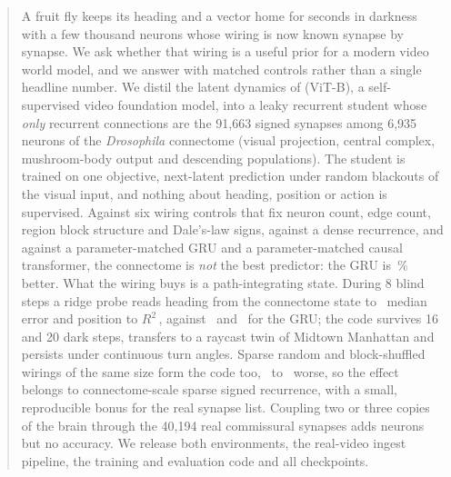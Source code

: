 \begin{abstract}
A fruit fly keeps its heading and a vector home for seconds in darkness with a few thousand neurons whose wiring is
now known synapse by synapse. We ask whether that wiring is a useful prior for a modern video world model, and we
answer with matched controls rather than a single headline number. We distil the latent dynamics of \vjepa (ViT-B),
a self-supervised video foundation model, into a leaky recurrent student whose \emph{only} recurrent connections are
the 91,663 signed synapses among 6,935 neurons of the \flywire \emph{Drosophila} connectome (visual projection, central
complex, mushroom-body output and descending populations). The student is trained on one objective, next-latent
prediction under random blackouts of the visual input, and nothing about heading, position or action is supervised.
Against six wiring controls that fix neuron count, edge count, region block structure and Dale's-law signs, against a
dense recurrence, and against a parameter-matched GRU and a parameter-matched causal transformer, the connectome is
\emph{not} the best predictor: the GRU is \nGruBetterArena\,\% better. What the wiring buys is a path-integrating
state. During 8 blind steps a ridge probe reads heading from the connectome state to \nConnArenaHd\degree\ median error
and position to $R^2$\,\nConnArenaPos, against \nGruArenaHd\degree\ and \nGruArenaPos\ for the GRU; the code survives
16 and 20 dark steps, transfers to a raycast twin of Midtown Manhattan and persists under continuous turn angles. Sparse
random and block-shuffled wirings of the same size form the code too, \nConnBlockGapArena\ to
\nConnBlockGapArenaDarkSixteen\degree\ worse, so the effect belongs to connectome-scale sparse signed recurrence, with a
small, reproducible bonus for the real synapse list. Coupling two or three copies of the brain through the 40,194 real
commissural synapses adds neurons but no accuracy. We release both environments, the real-video ingest pipeline, the
training and evaluation code and all checkpoints.
\end{abstract}
